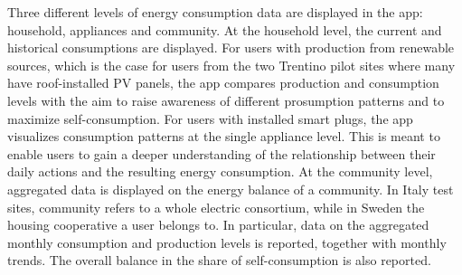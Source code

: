 Three different levels of energy consumption data are displayed in the app: household, appliances and community. 
At the household level, the current and historical consumptions are displayed. For users with production from renewable sources, which is the case for users from the two Trentino pilot sites where many have roof-installed PV panels, the app compares production and consumption levels with the aim to raise awareness of different prosumption patterns and to maximize self-consumption. 
% 
For users with installed smart plugs, the app visualizes consumption patterns at the single appliance level. This is meant to enable users to gain a deeper understanding of the relationship between their daily actions and the resulting energy consumption. 
%
At the community level, aggregated data is displayed on the energy balance of a community. In Italy test sites, community refers to a whole electric consortium, while in Sweden the housing cooperative a user belongs to. 
In particular, data on the aggregated monthly consumption and production levels is reported, together with monthly trends. The overall balance in the share of self-consumption is also reported. 


